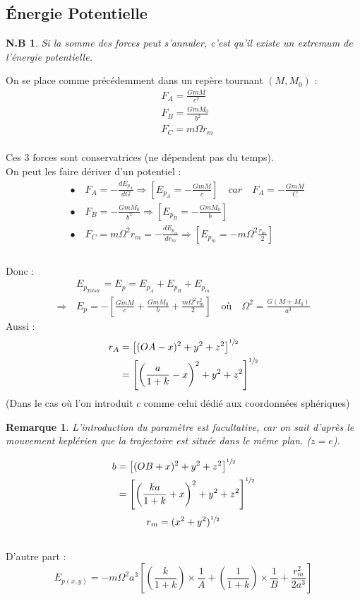 \documentclass[12pt]{article}
\newtheorem*{nota}{N.B}
\newtheorem*{req}{Remarque}
\begin{document}
\subsection{Énergie Potentielle}
\begin{nota}
Si la somme des forces peut s'annuler, c'est qu'il existe un extremum de l'énergie potentielle.
\end{nota}
On se place comme précédemment dans un repère tournant $(M,M_0)$ :
\begin{align*}
&F_A = \frac{GmM}{c^2} \\
&F_B = \frac{GmM_0}{b^2} \\
&F_C = m\Omega r_m
\end{align*} \\
Ces 3 forces sont conservatrices (ne dépendent pas du temps).\\ On peut les faire dériver d'un potentiel :
\begin{align*}
&\bullet \quad F_A = - \frac{dE_{p_A}}{dG} \Rightarrow \left[E_{p_A} = - \frac{GmM}{c}\right] \quad car \quad F_A = - \frac{GmM}{C} \\
&\bullet \quad F_B = - \frac{GmM_0}{b^2} \Rightarrow \left[E_{p_B} = - \frac{GmM_0}{b}\right] \\
&\bullet \quad F_C = m\Omega^2 r_m = - \frac{dE_{p_m}}{dr_m} \Rightarrow \left[E_{p_m} = -m\Omega^2 \frac{r_m}{2} \right] \\
\end{align*} \\
Donc : 
\begin{align*}
&E_{p_{Totale}} = E_p = E_{p_A} + E_{p_B} +E_{p_m} \\
\Rightarrow \, &E_p = - \left[\frac{GmM}{c} + \frac{GmM_0}{b} + \frac{m\Omega^2 r_m^2}{2}\right] \quad \text{où} \quad \Omega^2 = \frac{G(M+M_0)}{a^3}
\end{align*}
Aussi : 
\begin{align*}
r_A &= \left[(OA-x)^2 +y^2+z^2\right]^{\sfrac{1}{2}} \\
&= \left[\left(\frac{a}{1+k}-x\right)^2+y^2+z^2\right]^{\sfrac{1}{2}}
\end{align*}
(Dans le cas où l'on introduit $c$ comme celui dédié aux coordonnées sphériques) \\
\begin{req}
L'introduction du paramètre est facultative, car on sait d'après le mouvement keplérien que la trajectoire est située dans le même plan. ($z=e$).
\end{req}
\begin{align*}
b &= \left[(OB+x)^2 +y^2+z^2\right]^{\sfrac{1}{2}} \\
&= \left[\left(\frac{ka}{1+k}+x\right)^2+y^2+z^2\right]^{\sfrac{1}{2}}
\end{align*}
$$r_m = (x^2+y^2)^{\sfrac{1}{2}}$$ \\
D'autre part : 
$$ E_{p(x,y)} = - m\Omega^2a^3\left[\left(\frac{k}{1+k}\right) \times \frac{1}{A} + \left(\frac{1}{1+k}\right) \times \frac{1}{B} + \frac{r_m^2}{2a^3}\right]$$
\newpage
\end{document}
